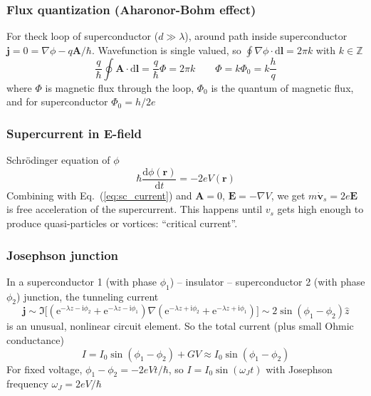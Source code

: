 \documentclass[11pt,letterpaper]{article}
\numberwithin{equation}{section} %
\renewcommand*{\vec}[1]{\bm{#1}}
\newcommand{\dif}{\mathrm d}
\newcommand\mi{\mathrm{i}}
\newcommand\e{\mathrm{e}}
\begin{document}
\subsubsection{Flux quantization (Aharonor-Bohm effect)}
\label{ssub:flux_quantization}
For theck loop of superconductor ($d\gg\lambda$), around path inside
superconductor $\vec j = 0 = \nabla\phi - q\vec A/\hbar$. Wavefunction is
single valued, so $\oint\nabla\phi\cdot\dif\vec l = 2\pi k$ with $k\in\mathbb Z$
\begin{equation}\label{eq:phi0}
	\frac q\hbar\oint\vec A\cdot\dif\vec l = \frac q\hbar \Phi = 2\pi k
	\qquad 
	\Phi = k\Phi_0 = k\frac hq
\end{equation}
where $\Phi$ is magnetic flux through the loop, $\Phi_0$ is the quantum of
magnetic flux, and for superconductor $\Phi_0 = h/2e$ 

\subsubsection[supercurrent in E-field]{Supercurrent in $\vec E$-field}
\label{ssub:super_current}
Schr\"odinger equation of $\phi$
\begin{equation}
	\hbar\frac{\dif\phi(\vec r)}{\dif t} = -2eV(\vec r)
\end{equation}
Combining with Eq.~(\ref{eq:sc_current}) and $\vec A=0$, $\vec E = -\nabla
V$, we get $m\dot{\vec v}_s = 2e\vec E$ is free acceleration of the
supercurrent. This happens until $v_s$ gets high enough to produce
quasi-particles or vortices: ``critical current''. 

\subsubsection{Josephson junction}
\label{ssub:josephson_junction}
In a superconductor 1 (with phase $\phi_1$) -- insulator -- superconductor 2
(with phase $\phi_2$) junction, the tunneling current
\begin{equation}
	\vec j\sim \Im \big[ (\e^{-\lambda z - \mi\phi_2} + 
			\e^{-\lambda z - \mi\phi_1})\nabla (\e^{-\lambda z + \mi\phi_2} + 
		\e^{-\lambda z + \mi\phi_1})\big]
		\sim 2\sin(\phi_1 - \phi_2)\hat z 
\end{equation}
is an unusual, nonlinear circuit element. So the total current (plus small
Ohmic conductance)
\begin{equation}
	I = I_0\sin(\phi_1 - \phi_2) + GV \approx I_0\sin(\phi_1 - \phi_2)
\end{equation}
For fixed voltage, $\phi_1 - \phi_2 = -2eVt/\hbar$, so $I = I_0\sin(\omega_J
t)$ with Josephson frequency $\omega_J = 2eV/\hbar$
\end{document}
